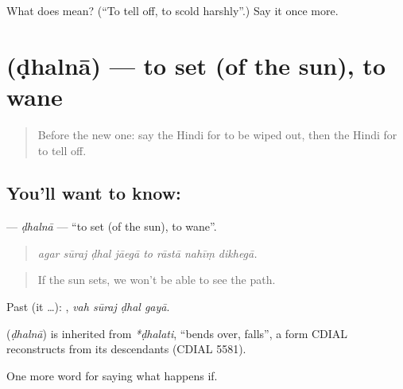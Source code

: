 \begin{tcolorbox}[breakable,colback=teal!4,colframe=teal!35!black,title={Before you move on}]
What does  mean? (\textquotedblleft{}To tell off, to scold harshly\textquotedblright{}.) Say it once more.
\end{tcolorbox}
\section[\texorpdfstring{\hi{ढलना} (ḍhalnā)}{ढलना (ḍhalnā)}]{ (ḍhalnā) — to set (of the sun), to wane}

\label{lesson:HI-C385-dhalna}



\begin{quote}
Before the new one: say the Hindi for to be wiped out, then the Hindi for to tell off.
\end{quote}

\subsection*{You'll want to know: }
\textbf{} — \emph{ḍhalnā} — \textquotedblleft{}to set (of the sun), to wane\textquotedblright{}.

\begin{quote}
       
\end{quote}

\begin{quote}
\emph{agar sūraj ḍhal jāegā to rāstā nahīṃ dikhegā.}
\end{quote}

\begin{quote}
If the sun sets, we won't be able to see the path.
\end{quote}

Past (it …):    , \emph{vah sūraj ḍhal gayā}.

\begin{cousinweb}
\textbf{} (\emph{ḍhalnā}) is inherited from \emph{*ḍhalati}, \textquotedblleft{}bends over, falls\textquotedblright{}, a form CDIAL reconstructs from its descendants (CDIAL 5581).
\end{cousinweb}

\begin{grammarlens}[title={What you've built}]
One more word for saying what happens if.
\end{grammarlens}

